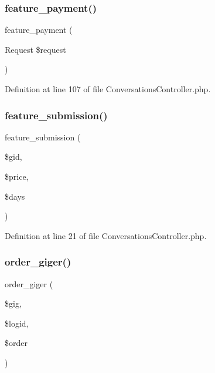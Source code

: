 \subsubsection{\texorpdfstring{feature\_payment()}{feature\_payment()}}
{\footnotesize\ttfamily feature\+\_\+payment (\begin{DoxyParamCaption}\item[{Request}]{\$request }\end{DoxyParamCaption})\hspace{0.3cm}{\ttfamily [protected]}}



Definition at line 107 of file Conversations\+Controller.\+php.

\mbox{\label{class_responsive_1_1_http_1_1_controllers_1_1_conversations_controller_a921faa23a279afa2856d43c2d26ca47a}} 
\subsubsection{\texorpdfstring{feature\_submission()}{feature\_submission()}}
{\footnotesize\ttfamily feature\+\_\+submission (\begin{DoxyParamCaption}\item[{}]{\$gid,  }\item[{}]{\$price,  }\item[{}]{\$days }\end{DoxyParamCaption})}



Definition at line 21 of file Conversations\+Controller.\+php.

\mbox{\label{class_responsive_1_1_http_1_1_controllers_1_1_conversations_controller_a4443ea658fd0a7bd8e7c965dbe01506b}} 
\subsubsection{\texorpdfstring{order\_giger()}{order\_giger()}}
{\footnotesize\ttfamily order\+\_\+giger (\begin{DoxyParamCaption}\item[{}]{\$gig,  }\item[{}]{\$logid,  }\item[{}]{\$order }\end{DoxyParamCaption})}



